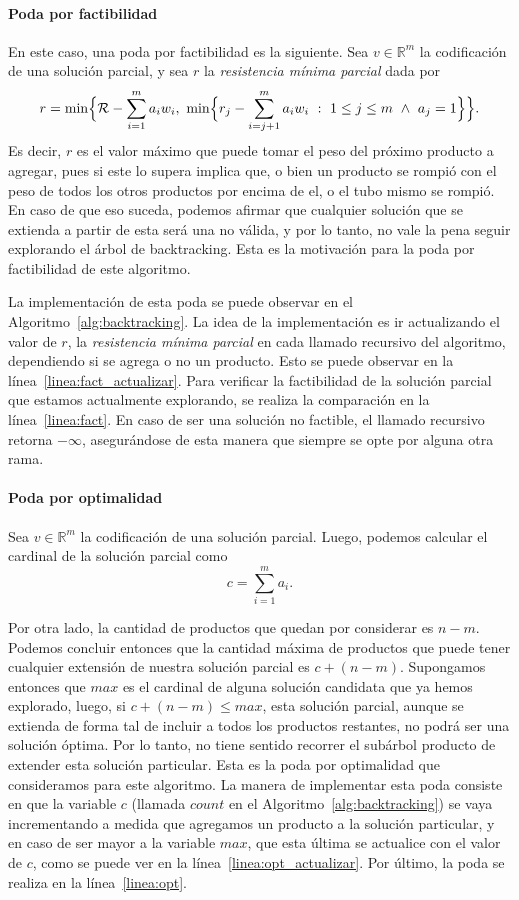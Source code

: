 \documentclass{article}
\DeclarePairedDelimiter\curl{\{}{\}}
\DeclarePairedDelimiter\bigcurl{\Big\{}{\Big\}}
\newcommand{\Rn}[1]{\mathbb{R}^{#1}}
\newcommand{\Res}{\mathcal{R}}
\begin{document}
\paragraph{Poda por factibilidad}
En este caso, una poda por factibilidad es la siguiente. Sea $v\in\Rn{m}$ la codificación de una solución parcial, y sea $r$ la \emph{resistencia mínima parcial} dada por
\[
    r = \min\bigcurl{\Res{} - \sum_{i = 1}^{m}{a_{i}w_{i}},\
        \min\bigcurl{r_{j} - \sum_{i = j + 1}^{m}{a_{i}w_{i}}\ : \ 1 \leq j \leq m \ \wedge \ a_{j} = 1}}.
\]
Es decir, $r$ es el valor máximo que puede tomar el peso del próximo producto a agregar, pues si este lo supera implica que, o bien un producto se rompió con el peso de todos los otros productos por encima de el, o el tubo mismo se rompió. En caso de que eso suceda, podemos afirmar que cualquier solución que se extienda a partir de esta será una no válida, y por lo tanto, no vale la pena seguir explorando el árbol de backtracking. Esta es la motivación para la poda por factibilidad de este algoritmo.

La implementación de esta poda se puede observar en el Algoritmo~\ref{alg:backtracking}. La idea de la implementación es ir actualizando el valor de $r$, la \emph{resistencia mínima parcial} en cada llamado recursivo del algoritmo, dependiendo si se agrega o no un producto. Esto se puede observar en la línea~\ref{linea:fact_actualizar}. Para verificar la factibilidad de la solución parcial que estamos actualmente explorando, se realiza la comparación en la línea~\ref{linea:fact}. En caso de ser una solución no factible, el llamado recursivo retorna $-\infty$, asegurándose de esta manera que siempre se opte por alguna otra rama.

\paragraph{Poda por optimalidad}
Sea $v \in \Rn{m}$ la codificación de una solución parcial. Luego, podemos calcular el cardinal de la solución parcial como
\[
    c = \sum_{i = 1}^{m}{a_{i}}.
\]

Por otra lado, la cantidad de productos que quedan por considerar es $n - m$. Podemos concluir entonces que la cantidad máxima de productos que puede tener cualquier extensión de nuestra solución parcial es $c + (n - m)$. Supongamos entonces que $max$ es el cardinal de alguna solución candidata que ya hemos explorado, luego, si $c + (n - m) \leq max$, esta solución parcial, aunque se extienda de forma tal de incluir a todos los productos restantes, no podrá ser una solución óptima. Por lo tanto, no tiene sentido recorrer el subárbol producto de extender esta solución particular. Esta es la poda por optimalidad que consideramos para este algoritmo. La manera de implementar esta poda consiste en que la variable $c$ (llamada $count$ en el Algoritmo~\ref{alg:backtracking}) se vaya incrementando a medida que agregamos un producto a la solución particular, y en caso de ser mayor a la variable $max$, que esta última se actualice con el valor de $c$, como se puede ver en la línea~\ref{linea:opt_actualizar}. Por último, la poda se realiza en la línea~\ref{linea:opt}.
\end{document}
